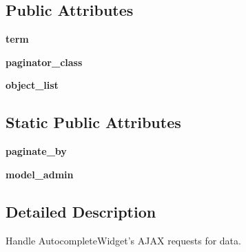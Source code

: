 \subsection*{Public Attributes}
\begin{DoxyCompactItemize}
\item 
\mbox{\label{classdjango_1_1contrib_1_1admin_1_1views_1_1autocomplete_1_1_autocomplete_json_view_a477c2b681ef68eeef846d7ceb1e00f81}} 
{\bfseries term}
\item 
\mbox{\label{classdjango_1_1contrib_1_1admin_1_1views_1_1autocomplete_1_1_autocomplete_json_view_a9eaed92620b32d3dae8500d2d0084475}} 
{\bfseries paginator\+\_\+class}
\item 
\mbox{\label{classdjango_1_1contrib_1_1admin_1_1views_1_1autocomplete_1_1_autocomplete_json_view_ace6ff6b912fb1e932b1cc94834b82dd3}} 
{\bfseries object\+\_\+list}
\end{DoxyCompactItemize}
\subsection*{Static Public Attributes}
\begin{DoxyCompactItemize}
\item 
\mbox{\label{classdjango_1_1contrib_1_1admin_1_1views_1_1autocomplete_1_1_autocomplete_json_view_afc91c5f5813b821fcf04bbc2f973503d}} 
{\bfseries paginate\+\_\+by}
\item 
\mbox{\label{classdjango_1_1contrib_1_1admin_1_1views_1_1autocomplete_1_1_autocomplete_json_view_a3798be6ce60bf188d04a6a8ea7a652dc}} 
{\bfseries model\+\_\+admin}
\end{DoxyCompactItemize}


\subsection{Detailed Description}
\begin{DoxyVerb}Handle AutocompleteWidget's AJAX requests for data.\end{DoxyVerb}
 

